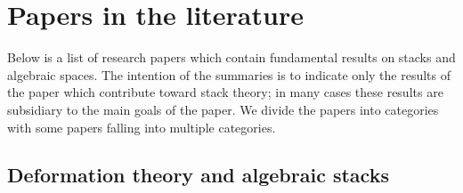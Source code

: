 \section{Papers in the literature}
\label{section-papers}

\noindent
Below is a list of research papers which contain fundamental results on stacks
and algebraic spaces. The intention of the summaries is to indicate only the
results of the paper which contribute toward stack theory; in many cases these
results are subsidiary to the main goals of the paper. We divide the papers
into categories with some papers falling into multiple categories.


\subsection{Deformation theory and algebraic stacks}
\label{subsection-deformation-theory}

